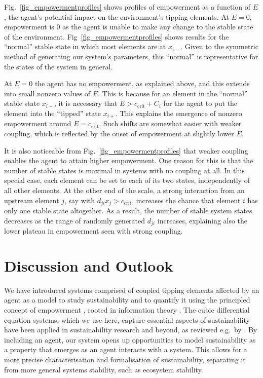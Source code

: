 \documentclass[letterpaper]{article}
\newcommand{\ccrit}{\ensuremath{c_{\mathrm{crit}}}}
\begin{document}
Fig.~\ref{fig_empowermentprofiles} shows profiles of empowerment as a
function of $E$, the agent's potential impact on the environment's
tipping elements. At $E = 0$, empowerment is $0$ as the agent is
unable to make any change to the stable state of the environment.
Fig~\ref{fig_empowermentprofiles} shows results for the ``normal''
stable state in which most elements are at $x_{i-}$. Given to the
symmetric method of generating our system's parameters, this
``normal'' is representative for the states of the system in general.

At $E = 0$ the agent has no empowerment, as explained above, and this
extends into small nonzero values of $E$. This is because for an
element in the ``normal'' stable state $x_{i-}$, it is necessary that
$E > \ccrit + C_i$ for the agent to put the element into the
``tipped'' state $x_{i+}$. This explains the emergence of nonzero
empowerment around $E = \ccrit$. Such shifts are somewhat easier with
weaker coupling, which is reflected by the onset of empowerment at
slightly lower $E$.

It is also noticeable from Fig.~\ref{fig_empowermentprofiles} that
weaker coupling enables the agent to attain higher empowerment. One
reason for this is that the number of stable states is maximal in
systems with no coupling at all. In this special case, each element
can be set to each of its two states, independently of all other
elements. At the other end of the scale, a strong interaction from an
upstream element $j$, say with $d_{ji} x_j > \ccrit$, increases the
chance that element $i$ has only one stable state altogether. As a
result, the number of stable system states decreases as the range of
randomly generated $d_{ji}$ increases, explaining also the lower
plateau in empowerment seen with strong coupling.


\section{Discussion and Outlook}


We have introduced systems comprised of coupled tipping elements
affected by an agent as a model to study sustainability and to
quantify it using the principled concept of empowerment
\citep{Salge2014_empowermentintro}, rooted in information theory
\citep{CoverThomas1991_informationtheory}. The cubic differential
equation systems, which we use here, capture essential aspects of
sustainability have been applied in sustainability research and
beyond, as reviewed e.g.\ by
\citet{Klose2019_interactingtippingelements}. By including an agent,
our system opens up opportunities to model sustainability as a
property that emerges as an agent interacts with a system. This allows
for a more precise characterisation and formalisation of
sustainability, separating it from more general systems stability,
such as ecosystem stability.
\end{document}
